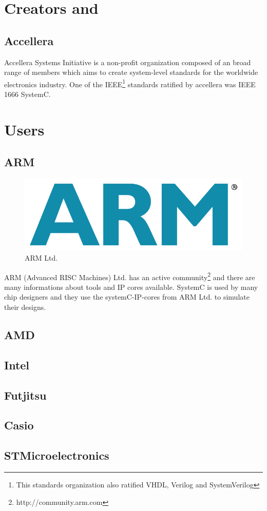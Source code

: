 \documentclass{article}
\begin{document}
	\section{Creators and }
	  \subsection{Accellera}
	  Accellera Systems Initiative is a non-profit organization composed of an broad range of members which aims to create system-level standards for the worldwide electronics industry.
	  One of the IEEE\footnote{This standards organization also ratified VHDL, Verilog and SystemVerilog} standards ratified by accellera was IEEE 1666 SystemC.
	  
	\section{Users}
	\subsection{ARM}
	    \begin{figure}[hp]
	      \centering
	      \includegraphics[scale=0.18]{../pictures/armlogo.jpg}
	      \caption{ARM Ltd.}
	      \label{fig:arm}
	    \end{figure}  
	    ARM (Advanced RISC Machines) Ltd. has an active community\footnote{http://community.arm.com} and there are many informations about tools and IP cores available.
	    SystemC is used by many chip designers and they use the systemC-IP-cores from ARM Ltd. to simulate their designs.
	  \subsection{AMD}
	  
	  \subsection{Intel}
	  
	  \subsection{Futjitsu}
	  
	  \subsection{Casio}
	  
	  \subsection{STMicroelectronics}
	  
\end{document}
